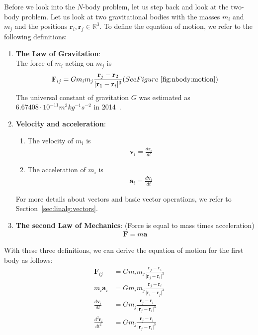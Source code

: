 Before we look into the $N$-body problem, let us step back and look at the two-body problem. Let us look at two gravitational bodies with the masses $m_i$ and $m_j$ and the positions $\mathbf{r}_i,\mathbf{r}_j\in\mathbb{R}^3$. To define the equation of motion, we refer to the following definitions:
\vspace{0.25cm}
\begin{enumerate}
\item \textbf{The Law of Gravitation}: \\
The force of $m_i$ acting on $m_j$ is 
\begin{align}
\mathbf{F}_{ij}= G m_i m_j \frac{\mathbf{r}_j-\mathbf{r}_2}{\vert \mathbf{r}_1-\mathbf{r}_i \vert^3} (See Figure~\ref{fig:nbody:motion})
\end{align}
The universal constant of gravitation $G$ was estimated as $6.67408\cdot 10^{-11}m^3kg^{-1}s^{-2}$ in 2014~\cite{mohr2016codata}.
\item \textbf{Velocity and acceleration}: 
\begin{enumerate}
\item The velocity of $m_i$ is
\begin{align}
\mathbf{v}_i = \frac{d \mathbf{r}_i}{dt} \label{eq:nbody:vel}
\end{align}
\item The acceleration of $m_i$ is
\begin{align}
\mathbf{a}_i = \frac{d \mathbf{v}_i}{dt} \label{eq:nbody:acc}
\end{align}
\end{enumerate}
For more details about vectors and basic vector operations, we refer to Section~\ref{sec:linalg:vectors}.
\item \textbf{The second Law of Mechanics}:  (Force is equal to mass times acceleration) 
\begin{align}
\mathbf{F}= m \mathbf{a} \label{eq:law:first}
\end{align}
\end{enumerate}
With these three definitions, we can derive the equation of motion for the first body as follows:
\begin{align}
\mathbf{F}_{ij}&=G m_i m_j \frac{\mathbf{r}_j-\mathbf{r}_i}{\vert \mathbf{r}_j-\mathbf{r}_i \vert^3} \label{eq:nbody:motion1} \\
m_i \mathbf{a}_i &= G m_i m_j \frac{\mathbf{r}_j-\mathbf{r}_i}{\vert \mathbf{r}_i-\mathbf{r}_j \vert^3} \label{eq:nbody:motion2} \\
\frac{d \mathbf{v}_i}{dt} & = G m_j \frac{\mathbf{r}_j-\mathbf{r}_i}{\vert \mathbf{r}_j-\mathbf{r}_i \vert^3} \label{eq:nbody:motion3} \\
\frac{d^2 \mathbf{r}_i}{dt^2} & = G m_j \frac{\mathbf{r}_j-\mathbf{r}_i}{\vert \mathbf{r}_j-\mathbf{r}_i \vert^3}
\label{eq:nbody:motion4}
\end{align}
